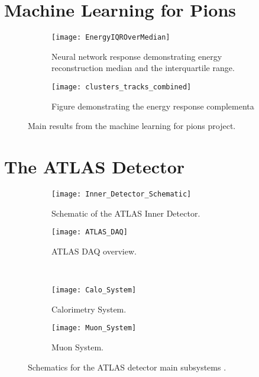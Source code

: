 \documentclass[12pt]{article}
\begin{document}
\clearpage
\newpage
\appendix{}
\section{Machine Learning for Pions}
\begin{figure}[h]
    \centering
    \begin{subfigure}[t]{.48\textwidth}
        \centering
        \texttt{[image: EnergyIQROverMedian]}
        \caption{Neural network response demonstrating energy reconstruction
        median and the interquartile range.}
        \label{sufig:ml4p_energy_response}
    \end{subfigure}
    \hfill
    \begin{subfigure}[t]{.48\textwidth}
        \centering
        \texttt{[image: clusters\_tracks\_combined]}
        \caption{Figure demonstrating the energy response complementa}
        \label{subfig:complimentarity}
    \end{subfigure}
\caption{Main results from the machine learning for pions project.}
\label{fig:ml4p_main_results.}
\end{figure}

\clearpage
\newpage
\section{The ATLAS Detector}
\begin{figure}[h]
    \centering
    \begin{subfigure}[t]{.48\textwidth}
        \centering
        \texttt{[image: Inner\_Detector\_Schematic]}
        \caption{Schematic of the ATLAS Inner Detector.}
        \label{subfig:inner_detector_schematic}
    \end{subfigure}
    \hfill
    \begin{subfigure}[t]{.48\textwidth}
        \centering
        \texttt{[image: ATLAS\_DAQ]}
        \caption{ATLAS DAQ overview.}
        \label{subfig:daq_schematic}
    \end{subfigure}
    ~
    \centering
    \begin{subfigure}[t]{.48\textwidth}
        \centering
        \texttt{[image: Calo\_System]}
        \caption{Calorimetry System.}
        \label{subfig:calo_schematic}
    \end{subfigure}
    \hfill
    \begin{subfigure}[t]{.48\textwidth}
        \centering
        \texttt{[image: Muon\_System]}
        \caption{Muon System.}
        \label{subfig:muon_system_schematic}
    \end{subfigure}
\caption{Schematics for the ATLAS detector main subsystems \cite{Aad_2024}.}
\label{fig:ATLAS_Schematics}
\end{figure}
\end{document}

